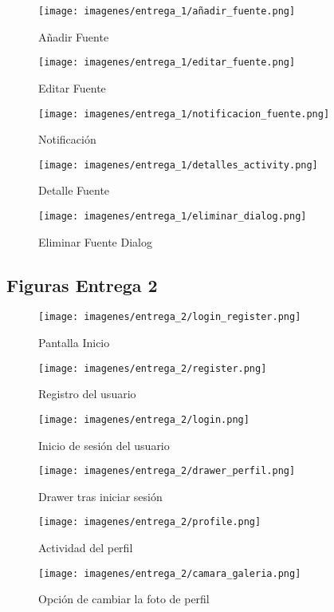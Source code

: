 \documentclass[11pt,a4paper]{article}
\begin{document}
\begin{figure}[H]
    \centering
    \texttt{[image: imagenes/entrega\_1/añadir\_fuente.png]}
    \caption{Añadir Fuente}
    \label{añadir}
\end{figure}
\begin{figure}[H]
    \centering
    \texttt{[image: imagenes/entrega\_1/editar\_fuente.png]}
    \caption{Editar Fuente}
    \label{editar}
\end{figure}
\begin{figure}[H]
    \centering
    \texttt{[image: imagenes/entrega\_1/notificacion\_fuente.png]}
    \caption{Notificación}
    \label{noti}
\end{figure}
\begin{figure}[H]
    \centering
    \texttt{[image: imagenes/entrega\_1/detalles\_activity.png]}
    \caption{Detalle Fuente}
    \label{detalle}
\end{figure}
\begin{figure}[H]
    \centering
    \texttt{[image: imagenes/entrega\_1/eliminar\_dialog.png]}
    \caption{Eliminar Fuente Dialog}
    \label{delete}
\end{figure}

\newpage
\subsection{Figuras Entrega 2}
\begin{figure}[H]
    \centering
    \texttt{[image: imagenes/entrega\_2/login\_register.png]}
    \caption{Pantalla Inicio}
    \label{login_register}
\end{figure}
\begin{figure}[H]
    \centering
    \texttt{[image: imagenes/entrega\_2/register.png]}
    \caption{Registro del usuario}
    \label{register}
\end{figure}
\begin{figure}[H]
    \centering
    \texttt{[image: imagenes/entrega\_2/login.png]}
    \caption{Inicio de sesión del usuario}
    \label{login}
\end{figure}

\begin{figure}[H]
    \centering
    \texttt{[image: imagenes/entrega\_2/drawer\_perfil.png]}
    \caption{Drawer tras iniciar sesión}
    \label{drawer_perfil}
\end{figure}
\begin{figure}[H]
    \centering
    \texttt{[image: imagenes/entrega\_2/profile.png]}
    \caption{Actividad del perfil}
    \label{perfil}
\end{figure}
\begin{figure}[H]
    \centering
    \texttt{[image: imagenes/entrega\_2/camara\_galeria.png]}
    \caption{Opción de cambiar la foto de perfil}
    \label{pfp}
\end{figure}
\end{document}
